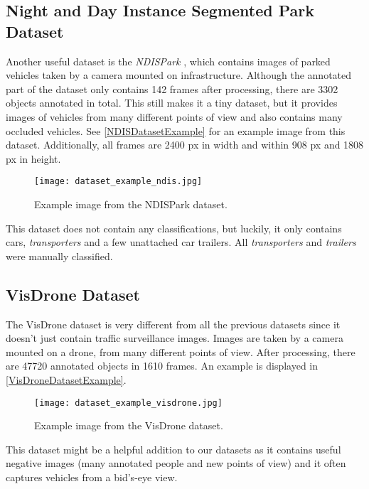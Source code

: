 \subsection{Night and Day Instance Segmented Park Dataset}

Another useful dataset is the \textit{NDISPark} \cite{Luca2022}, which contains
images of parked vehicles taken by a camera mounted on infrastructure. Although
the annotated part of the dataset only contains \num{142} frames after
processing, there are \num{3302} objects annotated in total. This still makes it
a tiny dataset, but it provides images of vehicles from many different points of
view and also contains many occluded vehicles. See \autoref{NDISDatasetExample}
for an example image from this dataset. Additionally, all frames are \num{2400}
px in width and within \num{908} px and \num{1808} px in height.

\begin{figure}[h]
    \centering
    \texttt{[image: dataset\_example\_ndis.jpg]}
    \caption{Example image from the NDISPark dataset.}
    \label{NDISDatasetExample}
\end{figure}

This dataset does not contain any classifications, but luckily, it only contains
cars, \textit{transporters} and a few unattached car trailers. All
\textit{transporters} and \textit{trailers} were manually classified.


\subsection{VisDrone Dataset}

The VisDrone dataset \cite{Zhu2022} is very different from all the previous
datasets since it doesn't just contain traffic surveillance images. Images are
taken by a camera mounted on a drone, from many different points of view. After
processing, there are \num{47720} annotated objects in \num{1610} frames. An
example is displayed in \autoref{VisDroneDatasetExample}.

\begin{figure}[h]
    \centering
    \texttt{[image: dataset\_example\_visdrone.jpg]}
    \caption{Example image from the VisDrone dataset.}
    \label{VisDroneDatasetExample}
\end{figure}

This dataset might be a helpful addition to our datasets as it contains useful
negative images (many annotated people and new points of view) and it often
captures vehicles from a bid's-eye view.


